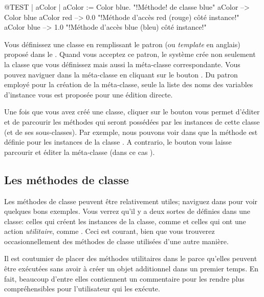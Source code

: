 \documentclass[a4paper,10pt,twoside]{book}
\begin{document}
\begin{code}{@TEST | aColor |}
aColor := Color blue.               "!M\'ethode! de classe blue"
aColor        --> Color blue
aColor red  --> 0.0         "!M\'ethode d'acc\`es red (rouge) c\^ot\'e instance!"
aColor blue --> 1.0        "!M\'ethode d'acc\`es blue (bleu) c\^ot\'e instance!"
\end{code}

Vous d\'efinissez une classe en remplissant le patron (ou \emph{template} en anglais) propos\'e
dans le .
Quand vous acceptez ce patron, le syst\`eme cr\'ee non seulement la classe
que vous d\'efinissez mais aussi la m\'eta-classe correspondante.
Vous pouvez naviguer dans la m\'eta-classe en cliquant sur le bouton .
Du patron employ\'e pour la cr\'eation de la m\'eta-classe, seule la
liste des noms des variables d'instance vous est propos\'ee pour une \'edition directe.  

Une fois que vous avez cr\'e\'e une classe, cliquer sur
le bouton  vous permet d'\'editer et de parcourir les
m\'ethodes qui seront poss\'ed\'ees par les instances de cette classe (et de ses sous-classes). Par exemple, nous pouvons voir dans  que 
la m\'ethode  est d\'efinie pour les instances de la classe .
A contrario, le bouton  vous laisse parcourir et \'editer
la m\'eta-classe (dans ce cas ).

\subsection{Les m\'ethodes de classe} 

Les m\'ethodes de classe peuvent \^etre relativement utiles; naviguez dans  pour voir quelques bons exemples.
Vous verrez qu'il y a deux sortes de  d\'efinies dans une classe: celles qui cr\'eent les instances de la classe, comme  et celles qui ont une action \emph{utilitaire}, 
comme .
Ceci est courant, bien que vous trouverez occasionnellement des m\'ethodes
de classe utilis\'ees d'une autre mani\`ere.

Il est coutumier de placer des m\'ethodes utilitaires dans le  parce qu'elles peuvent \^etre ex\'ecut\'ees
sans avoir \`a cr\'eer un objet additionnel dans un premier temps.
En fait, beaucoup d'entre elles contiennent un commentaire pour les rendre plus compr\'ehensibles pour l'utilisateur qui les ex\'ecute.
\end{document}
